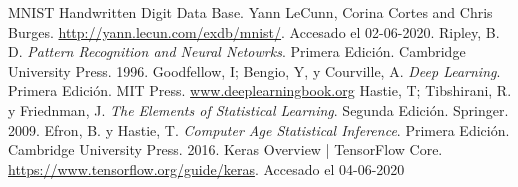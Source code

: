 \documentclass[11pt]{article}
\begin{document}
\pagebreak
\begin{thebibliography}{9}
     MNIST Handwritten Digit Data Base. Yann LeCunn, Corina Cortes and Chris Burges. \url{http://yann.lecun.com/exdb/mnist/}. Accesado el 02-06-2020.
     Ripley, B. D. \textit{Pattern Recognition and Neural Netowrks}. Primera Edición. Cambridge University Press. 1996.
     Goodfellow, I; Bengio, Y, y Courville, A. \textit{Deep Learning}. Primera Edición. MIT Press. \url{www.deeplearningbook.org}
     Hastie, T; Tibshirani, R. y Friednman, J. \textit{The Elements of Statistical Learning}. Segunda Edición. Springer. 2009.
     Efron, B. y Hastie, T. \textit{Computer Age Statistical Inference}. Primera Edición. Cambridge University Press. 2016.
     Keras Overview | TensorFlow Core. \url{https://www.tensorflow.org/guide/keras}. Accesado el 04-06-2020
\end{thebibliography}
\end{document}
